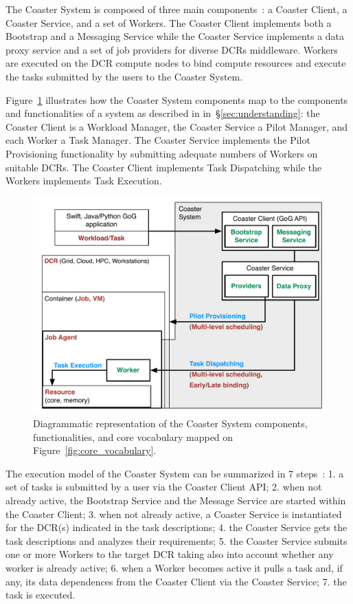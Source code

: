 \documentclass{sig-alternate}
\begin{document}
The Coaster System is composed of three main
components~\cite{hategan2011coasters}: a Coaster Client, a Coaster Service, and
a set of Workers. The Coaster Client implements both a Bootstrap and a Messaging
Service while the Coaster Service implements a data proxy service and a set of
job providers for diverse DCRs middleware. Workers are executed on the DCR
compute nodes to bind compute resources and execute the tasks submitted by the
users to the Coaster System.

Figure~\ref{fig:coaster_comparison} illustrates how the Coaster System
components map to the components and functionalities of a \pilot system as
described in in~\S\ref{sec:understanding}: the Coaster Client is a Workload
Manager, the Coaster Service a Pilot Manager, and each Worker a Task Manager.
The Coaster Service implements the Pilot Provisioning functionality by
submitting adequate numbers of Workers on suitable DCRs. The Coaster Client
implements Task Dispatching while the Workers implements Task Execution.

\begin{figure}[t]
    \centering
        \includegraphics[width=.48\textwidth]{figures/coaster_comparison.pdf}
    \caption{Diagrammatic representation of the Coaster System components,
    functionalities, and core vocabulary mapped on
    Figure~\ref{fig:core_vocabulary}.}
    \label{fig:coaster_comparison}
\end{figure}

The execution model of the Coaster System can be summarized in 7
steps~\cite{coasters_url}: 1. a set of tasks is submitted by a user via the
Coaster Client API; 2. when not already active, the Bootstrap Service and the
Message Service are started within the Coaster Client; 3. when not already
active, a Coaster Service is instantiated for the DCR(s) indicated in the task
descriptions; 4. the Coaster Service gets the task descriptions and analyzes
their requirements; 5. the Coaster Service submits one or more Workers to the
target DCR taking also into account whether any worker is already active; 6.
when a Worker becomes active it pulls a task and, if any, its data dependences
from the Coaster Client via the Coaster Service; 7. the task is executed.
\end{document}
